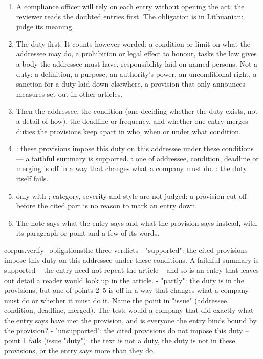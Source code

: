\begin{enumerate}[itemsep=1pt, topsep=3pt]
  \item A compliance officer will rely on each entry without opening the act; the reviewer
    reads the doubted entries first. The obligation is in Lithuanian: judge its meaning.
  \item The duty first. It counts however worded: a condition or limit on what the addressee
    may do, a prohibition or legal effect to honour, tasks the law gives a body the addressee
    must have, responsibility laid on named persons. Not a duty: a definition, a purpose, an
    authority's power, an unconditional right, a sanction for a duty laid down elsewhere, a
    provision that only announces measures set out in other articles.
  \item Then the addressee, the condition (one deciding whether the duty exists, not a detail
    of how), the deadline or frequency, and whether one entry merges duties the provisions
    keep apart in who, when or under what condition.
  \item {}: these provisions impose this duty on this addressee under these
    conditions --- a faithful summary is supported. : one of addressee,
    condition, deadline or merging is off in a way that changes what a company must do.
    : the duty itself fails.
  \item {} only with ; category, severity and style are not judged; a
    provision cut off before the cited part is no reason to mark an entry down.
  \item The note says what the entry says and what the provision says instead, with its
    paragraph or point and a few of its words.
\end{enumerate}

\par\nopagebreak
\begin{promptexcerpt}{corpus.verify_obligations}{the three verdicts}
- "supported": the cited provisions impose this duty on this addressee under these conditions. A faithful summary is supported – the entry need not repeat the article – and so is an entry that leaves out detail a reader would look up in the article.
- "partly": the duty is in the provisions, but one of points 2–5 is off in a way that changes what a company must do or whether it must do it. Name the point in "issue" (addressee, condition, deadline, merged). The test: would a company that did exactly what the entry says have met the provision, and is everyone the entry binds bound by the provision?
- "unsupported": the cited provisions do not impose this duty – point 1 fails (issue "duty"): the text is not a duty, the duty is not in these provisions, or the entry says more than they do.
\end{promptexcerpt}

